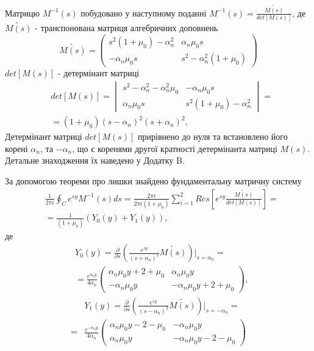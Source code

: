 Матрицю $M^{-1}(s)$ побудовано у наступному поданні $M^{-1}(s) = \frac{\widetilde{M(s)}}{det[M(s)]}$,
де $\widetilde{M(s)}$ - транспонована матриця алгебричних доповнень
\begin{equation}
    \widetilde{M(s)} = \begin{pmatrix}
        s^2 (1 + \mu_0) -\alpha_n^2 & \alpha_n \mu_0 s \\
        -\alpha_n \mu_0 s & s^2 -\alpha_n^2(1 + \mu_0)
     \end{pmatrix}
\end{equation}
$det[M(s)]$ - детермінант матриці
\begin{align}
    &det[M(s)] = \begin{vmatrix}
        s^2 - \alpha_n^2 - \alpha_n^2\mu_0 & -\alpha_n \mu_0 s \\
        \alpha_n \mu_0 s & s^2 (1 + \mu_0) -\alpha_n^2
     \end{vmatrix} = \nonumber \\
    &=(1+\mu_0)(s - \alpha_n)^2(s + \alpha_n)^2,
\end{align}
Детермінант матриці $det[M(s)]$ прирівнено до нуля
та встановлено його корені $\alpha_n$, та $-\alpha_n$, що є коренями другої кратності детермінанта матриці $M(s)$.
Детальне знаходження їх наведено у Додатку B.

За допомогою теореми про лишки знайдено фундаментальну матричну систему
\begin{align*}
    &\frac{1}{2\pi i} \oint_C e^{sy} M^{-1}(s)ds = \frac{2 \pi i}{2 \pi i (1 + \mu_0)} \sum_{i=1}^{2} Res\left[ e^{sy} \frac{\widetilde{M(s)}}{det[M(s)]} \right] = \\
    & = \frac{1}{(1 + \mu_0)} \left(Y_0(y) + Y_1(y) \right),
\end{align*}
де
\begin{align}\label{fund_mat_0_static_1}
    &Y_0(y) =  \frac{\partial}{\partial s} \left( \frac{e^{sy}}{(s+\alpha_n)^2} \widetilde{M(s)} \right) \Big|_{s=\alpha_n} = \nonumber \\
    &=\frac{e^{\alpha_n y}}{4\alpha_n} \begin{pmatrix}
    \alpha_n \mu_0 y + 2 + \mu_0 & \alpha_n \mu_0 y \\
    -\alpha_n \mu_0 y & -\alpha_n \mu_0 y + 2 + \mu_0
    \end{pmatrix},
\end{align}
\begin{align}\label{fund_mat_1_static_1}
    &Y_1(y) = \frac{\partial}{\partial s} \left(\frac{e^{sy}}{(s-\alpha_n)^2} \widetilde{M(s)} \right) \Big|_{s=-\alpha_n} = \nonumber \\
    =&\frac{e^{-\alpha_n y}}{4\alpha_n} \begin{pmatrix}
    \alpha_n \mu_0 y - 2 - \mu_0 & -\alpha_n \mu_0 y \\
    \alpha_n \mu_0 y & -\alpha_n \mu_0 y - 2 - \mu_0
    \end{pmatrix}
\end{align}

